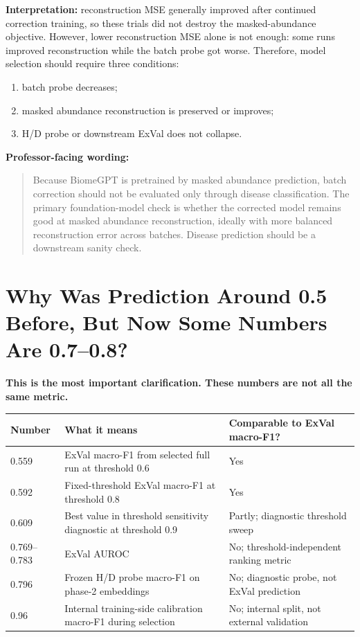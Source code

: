 \documentclass[11pt]{article}
\begin{document}
\textbf{Interpretation:} reconstruction MSE generally improved after continued
correction training, so these trials did not destroy the masked-abundance objective.
However, lower reconstruction MSE alone is not enough: some runs improved reconstruction
while the batch probe got worse. Therefore, model selection should require three
conditions:

\begin{enumerate}
  \item batch probe decreases;
  \item masked abundance reconstruction is preserved or improves;
  \item H/D probe or downstream ExVal does not collapse.
\end{enumerate}

\textbf{Professor-facing wording:}

\begin{quote}
Because BiomeGPT is pretrained by masked abundance prediction, batch correction should not
be evaluated only through disease classification. The primary foundation-model check is
whether the corrected model remains good at masked abundance reconstruction, ideally with
more balanced reconstruction error across batches. Disease prediction should be a
downstream sanity check.
\end{quote}

\section{Why Was Prediction Around 0.5 Before, But Now Some Numbers Are 0.7--0.8?}

\textbf{This is the most important clarification. These numbers are not all the same
metric.}

\begin{center}
\small
\begin{tabular}{lp{}p{}}
\toprule
Number & What it means & Comparable to ExVal macro-F1? \\
\midrule
0.559 & ExVal macro-F1 from selected full run at threshold 0.6 & Yes \\
0.592 & Fixed-threshold ExVal macro-F1 at threshold 0.8 & Yes \\
0.609 & Best value in threshold sensitivity diagnostic at threshold 0.9 & Partly; diagnostic threshold sweep \\
0.769--0.783 & ExVal AUROC & No; threshold-independent ranking metric \\
0.796 & Frozen H/D probe macro-F1 on phase-2 embeddings & No; diagnostic probe, not ExVal prediction \\
0.96 & Internal training-side calibration macro-F1 during selection & No; internal split, not external validation \\
\bottomrule
\end{tabular}
\end{center}
\end{document}
